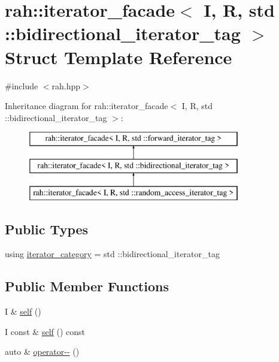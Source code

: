 \hypertarget{structrah_1_1iterator__facade_3_01_i_00_01_r_00_01std_01_1_1bidirectional__iterator__tag_01_4}{}\section{rah\+::iterator\+\_\+facade$<$ I, R, std \+::bidirectional\+\_\+iterator\+\_\+tag $>$ Struct Template Reference}
\label{structrah_1_1iterator__facade_3_01_i_00_01_r_00_01std_01_1_1bidirectional__iterator__tag_01_4}


{\ttfamily \#include $<$rah.\+hpp$>$}

Inheritance diagram for rah\+::iterator\+\_\+facade$<$ I, R, std \+::bidirectional\+\_\+iterator\+\_\+tag $>$\+:\begin{figure}[H]
\begin{center}
\leavevmode
\includegraphics[height=3.000000cm]{structrah_1_1iterator__facade_3_01_i_00_01_r_00_01std_01_1_1bidirectional__iterator__tag_01_4}
\end{center}
\end{figure}
\subsection*{Public Types}
\begin{DoxyCompactItemize}
\item 
using \mbox{\hyperlink{structrah_1_1iterator__facade_3_01_i_00_01_r_00_01std_01_1_1bidirectional__iterator__tag_01_4_a2dbd37e6d8e7ce99205c0dc26c7a4fd2}{iterator\+\_\+category}} = std \+::bidirectional\+\_\+iterator\+\_\+tag
\end{DoxyCompactItemize}
\subsection*{Public Member Functions}
\begin{DoxyCompactItemize}
\item 
I \& \mbox{\hyperlink{structrah_1_1iterator__facade_3_01_i_00_01_r_00_01std_01_1_1bidirectional__iterator__tag_01_4_a37ec81c2ce7b850cce5f99fd9341e7e4}{self}} ()
\item 
I const  \& \mbox{\hyperlink{structrah_1_1iterator__facade_3_01_i_00_01_r_00_01std_01_1_1bidirectional__iterator__tag_01_4_a5c701173657eb1c14b92a196ea74b498}{self}} () const
\item 
auto \& \mbox{\hyperlink{structrah_1_1iterator__facade_3_01_i_00_01_r_00_01std_01_1_1bidirectional__iterator__tag_01_4_a94b052cf2d8d56ffd7747f567b2ac4d2}{operator-\/-\/}} ()
\end{DoxyCompactItemize}


